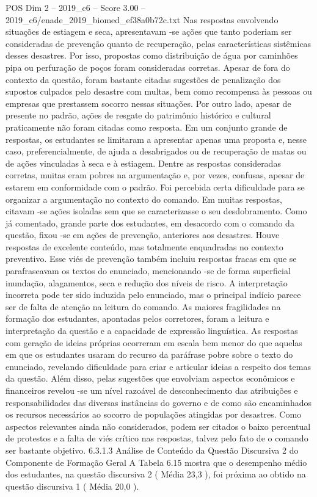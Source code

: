 \begin{textsample}{POS Dim 2 – 2019\_c6 – Score 3.00 – 2019\_c6/enade\_2019\_biomed\_ef38a0b72c.txt}
Nas respostas envolvendo situações de estiagem e seca, apresentavam -se ações que tanto poderiam ser consideradas de prevenção quanto de recuperação, pelas características sistêmicas desses desastres.
Por isso, propostas como distribuição de água por caminhões pipa ou perfuração de poços foram consideradas corretas.
Apesar de fora do contexto da questão, foram bastante citadas sugestões de penalização dos supostos culpados pelo desastre com multas, bem como recompensa às pessoas ou empresas que prestassem socorro nessas situações.
Por outro lado, apesar de presente no padrão, ações de resgate do patrimônio histórico e cultural praticamente não foram citadas como resposta.
Em um conjunto grande de respostas, os estudantes se limitaram a apresentar apenas uma proposta e, nesse caso, preferencialmente, de ajuda a desabrigados ou de recuperação de matas ou de ações vinculadas à seca e à estiagem.
Dentre as respostas consideradas corretas, muitas eram pobres na argumentação e, por vezes, confusas, apesar de estarem em conformidade com o padrão.
Foi percebida certa dificuldade para se organizar a argumentação no contexto do comando.
Em muitas respostas, citavam -se ações isoladas sem que se caracterizasse o seu desdobramento.
Como já comentado, grande parte dos estudantes, em desacordo com o comando da questão, fixou -se em ações de prevenção, anteriores aos desastres.
Houve respostas de excelente conteúdo, mas totalmente enquadradas no contexto preventivo.
Esse viés de prevenção também incluiu respostas fracas em que se parafraseavam os textos do enunciado, mencionando -se de forma superficial inundação, alagamentos, seca e redução dos níveis de risco.
A interpretação incorreta pode ter sido induzida pelo enunciado, mas o principal indício parece ser de falta de atenção na leitura do comando.
As maiores fragilidades na formação dos estudantes, apontadas pelos corretores, foram a leitura e interpretação da questão e a capacidade de expressão linguística.
As respostas com geração de ideias próprias ocorreram em escala bem menor do que aquelas em que os estudantes usaram do recurso da paráfrase pobre sobre o texto do enunciado, revelando dificuldade para criar e articular ideias a respeito dos temas da questão.
Além disso, pelas sugestões que envolviam aspectos econômicos e financeiros revelou -se um nível razoável de desconhecimento das atribuições e responsabilidades das diversas instâncias do governo e de como são encaminhados os recursos necessários ao socorro de populações atingidas por desastres.
Como aspectos relevantes ainda não considerados, podem ser citados o baixo percentual de protestos e a falta de viés crítico nas respostas, talvez pelo fato de o comando ser bastante objetivo. 6.3.1.3 Análise de Conteúdo da Questão Discursiva 2 do Componente de Formação Geral A Tabela 6.15 mostra que o desempenho médio dos estudantes, na questão discursiva 2 ( Média 23,3 ), foi próxima ao obtido na questão discursiva 1 ( Média 20,0 ).

\end{textsample}
